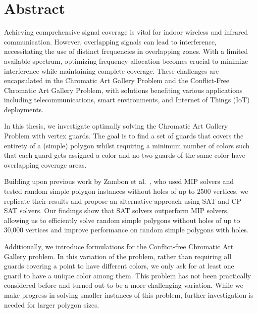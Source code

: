 \chapter*{Abstract}
Achieving comprehensive signal coverage is vital for indoor wireless and infrared communication. However, overlapping signals can lead to interference, necessitating the use of distinct frequencies in overlapping zones. With a limited available spectrum, optimizing frequency allocation becomes crucial to minimize interference while maintaining complete coverage. These challenges are encapsulated in the Chromatic Art Gallery Problem and the Conflict-Free Chromatic Art Gallery Problem, with solutions benefiting various applications including telecommunications, smart environments, and Internet of Things (IoT) deployments.

In this thesis, we investigate optimally solving the Chromatic Art Gallery Problem with vertex guards. The goal is to find a set of guards that covers the entirety of a (simple) polygon whilst requiring a minimum number of colors such that each guard gets assigned a color and no two guards of the same color have overlapping coverage areas.

Building upon previous work by Zambon et al.~\cite{zambon2014exact}, who used MIP solvers and tested random simple polygon instances without holes of up to 2500 vertices, we replicate their results and propose an alternative approach using SAT and CP-SAT solvers. Our findings show that SAT solvers outperform MIP solvers, allowing us to efficiently solve random simple polygons without holes of up to 30,000 vertices and improve performance on random simple polygons with holes. 

Additionally, we introduce formulations for the Conflict-free Chromatic Art Gallery problem. In this variation of the problem, rather than requiring all guards covering a point to have different colors, we only ask for at least one guard to have a unique color among them. This problem has not been practically considered before and turned out to be a more challenging variation. While we make progress in solving smaller instances of this problem, further investigation is needed for larger polygon sizes.
